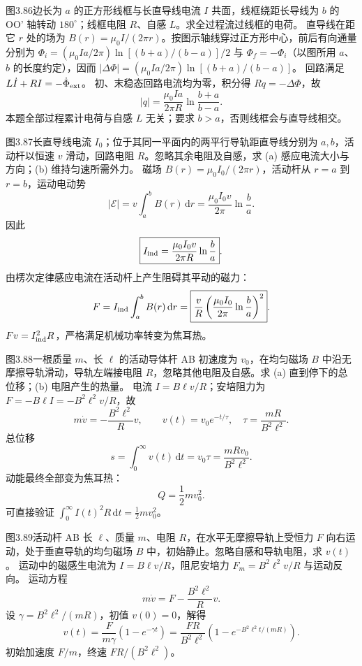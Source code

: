 图3.86边长为 $a$ 的正方形线框与长直导线电流 $I$ 共面，线框绕距长导线为 $b$ 的 OO' 轴转动 $180^\circ$；线框电阻 $R$、自感 $L$。求全过程流过线框的电荷。
\exsolution
直导线在距它 $r$ 处的场为
$B(r)=\mu_0I/(2\pi r)$。按图示轴线穿过正方形中心，前后有向通量分别为
$\Phi_i=(\mu_0Ia/2\pi)\ln[(b+a)/(b-a)]/2$ 与
$\Phi_f=-\Phi_i$（以图所用 $a$、$b$ 的长度约定），因而
$|\Delta\Phi|=(\mu_0Ia/2\pi)\ln[(b+a)/(b-a)]$。
回路满足
$L\dot I+RI=-\dot\Phi_{\rm ext}$。
初、末稳态回路电流均为零，积分得
$Rq=-\Delta\Phi$，故
\[
\boxed{|q|=\frac{\mu_0Ia}{2\pi R}
\ln\frac{b+a}{b-a}}.
\]
\excheck 本题全部过程累计电荷与自感 $L$ 无关；要求 $b>a$，否则线框会与直导线相交。

图3.87长直导线电流 $I_0$；位于其同一平面内的两平行导轨距直导线分别为 $a,b$，活动杆以恒速 $v$ 滑动，回路电阻 $R$。忽略其余电阻及自感，求 (a) 感应电流大小与方向；(b) 维持匀速所需外力。
\exsolution
磁场 $B(r)=\mu_0I_0/(2\pi r)$，活动杆从 $r=a$ 到 $r=b$，运动电动势
\[
|\mathcal E|=v\int_a^bB(r)\,\mathrm dr
=\frac{\mu_0I_0v}{2\pi}\ln\frac ba.
\]
因此
\[
\boxed{I_{\rm ind}=\frac{\mu_0I_0v}{2\pi R}\ln\frac ba}.
\]
由楞次定律感应电流在活动杆上产生阻碍其平动的磁力：
\[
F=I_{\rm ind}\int_a^bB(r)\,\mathrm dr
=\boxed{\frac vR\left(
\frac{\mu_0I_0}{2\pi}\ln\frac ba
\right)^2}.
\]
\excheck $Fv=I_{\rm ind}^2R$，严格满足机械功率转变为焦耳热。

图3.88一根质量 $m$、长 $\ell$ 的活动导体杆 AB 初速度为 $v_0$，在均匀磁场 $B$ 中沿无摩擦导轨滑动，导轨左端接电阻 $R$，忽略其他电阻及自感。求 (a) 直到停下的总位移；(b) 电阻产生的热量。
\exsolution
电流 $I=B\ell v/R$；安培阻力为
$F=-B\ell I=-B^2\ell^2v/R$，故
\[
m\dot v=-\frac{B^2\ell^2}{R}v,\qquad
v(t)=v_0e^{-t/\tau},\quad
\tau=\frac{mR}{B^2\ell^2}.
\]
总位移
\[
\boxed{s=\int_0^\infty v(t)\,\mathrm dt
=v_0\tau=\frac{mRv_0}{B^2\ell^2}}.
\]
动能最终全部变为焦耳热：
\[
\boxed{Q=\frac12mv_0^2}.
\]
\excheck 可直接验证
$\int_0^\infty I(t)^2R\,\mathrm dt
=\frac12mv_0^2$。

图3.89活动杆 AB 长 $\ell$、质量 $m$、电阻 $R$，在水平无摩擦导轨上受恒力 $F$ 向右运动，处于垂直导轨的均匀磁场 $B$ 中，初始静止。忽略自感和导轨电阻，求 $v(t)$。
\exsolution
运动中的磁感生电流为
$I=B\ell v/R$，阻尼安培力
$F_m=B^2\ell^2v/R$ 与运动反向。
运动方程
\[
m\dot v=F-\frac{B^2\ell^2}{R}v.
\]
设 $\gamma=B^2\ell^2/(mR)$，初值 $v(0)=0$，解得
\[
\boxed{v(t)=\frac{F}{m\gamma}
(1-e^{-\gamma t})
=\frac{FR}{B^2\ell^2}
\left(1-e^{-B^2\ell^2t/(mR)}\right)}.
\]
\excheck 初始加速度 $F/m$，终速 $FR/(B^2\ell^2)$。

